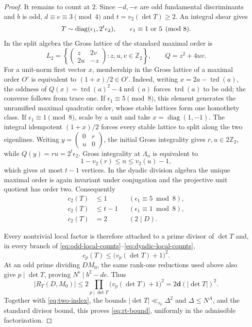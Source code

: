 \documentclass[11pt,reqno]{amsart}
\theoremstyle{definition}
\newcommand{\Z}{\mathbb Z}
\newcommand{\trd}{\operatorname{trd}}
\newcommand{\nrd}{\operatorname{nrd}}
\newcommand{\dd}{\mathbf d}
\begin{document}
\begin{proof}
It remains to count at $2$.  Since $-d,-e$ are odd fundamental
discriminants and $b$ is odd, $d\equiv e\equiv3\pmod4$ and
$t=v_2(\det T)\geq2$.  An integral shear gives
\[
 T\sim\operatorname{diag}(\epsilon_1,2^t\epsilon_2),
 \qquad \epsilon_1\equiv1\ \hbox{or}\ 5\pmod8.
\]
In the split algebra the Gross lattice of the standard maximal order is
\[
 L_2=\left\{\begin{pmatrix}z&2v\\2u&-z\end{pmatrix}:
 z,u,v\in\Z_2\right\},\qquad Q=z^2+4uv.
\]
For a unit-norm first vector $x$, membership in the Gross lattice of a
maximal order $O'$ is equivalent to $(1+x)/2\in O'$.  Indeed, writing
$x=2a-\trd(a)$, the oddness of $Q(x)=\trd(a)^2-4\nrd(a)$ forces
$\trd(a)$ to be odd; the converse follows from trace one.  If
$\epsilon_1\equiv5\pmod8$, this element generates the unramified maximal
quadratic order, whose stable lattices form one homothety class.  If
$\epsilon_1\equiv1\pmod8$, scale by a unit and take
$x=\operatorname{diag}(1,-1)$.  The integral idempotent $(1+x)/2$ forces
every stable lattice to split along the two eigenlines.  Writing
$y=\left(\begin{smallmatrix}0&r\\u&0\end{smallmatrix}\right)$, the initial
Gross integrality gives $r,u\in2\Z_2$, while
$Q(y)=ru=2^t\epsilon_2$.  Gross integrality at $\Lambda_n$ is equivalent to
\[
 1-v_2(r)\leq n\leq v_2(u)-1,
\]
which gives at most $t-1$ vertices.  In the dyadic division algebra the
unique maximal order is again invariant under conjugation and the
projective unit quotient has order two.  Consequently
\begin{equation}\label{eq:dyadic-local-counts}
 \begin{aligned}
  c_2(T)&\leq1 &&(\epsilon_1\equiv5\bmod8),\\
  c_2(T)&\leq t-1 &&(\epsilon_1\equiv1\bmod8),\\
  c_2(T)&=2 &&(2\mid D).
 \end{aligned}
\end{equation}

Every nontrivial local factor is therefore attached to a prime divisor of
$\det T$ and, in every branch of
\eqref{eq:odd-local-counts}--\eqref{eq:dyadic-local-counts},
\[
 c_p(T)\leq\bigl(v_p(\det T)+1\bigr)^2.
\]
At an odd prime dividing $D M_0$, the same rank-one reductions used above
also give $p\mid\det T$, proving $N^\flat\mid b^2-de$.  Thus
\[
 |R_T(D,M_0)|\leq2\prod_{p\mid\det T}
 \bigl(v_p(\det T)+1\bigr)^2=2\dd(|\det T|)^2.
\]
Together with \eqref{eq:two-index}, the bounds
$|\det T|\ll_{r_0}\Delta^2$ and $\Delta\leq N^A$, and the standard divisor
bound, this proves \eqref{eq:rt-bound}, uniformly in the admissible
factorization.
\end{proof}
\end{document}
